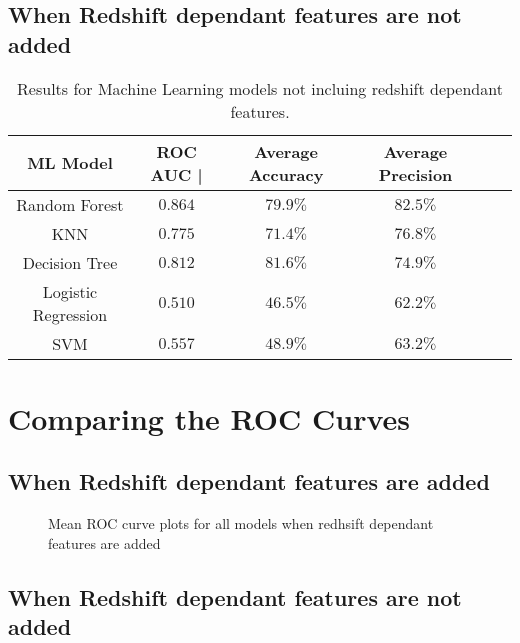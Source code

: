 \documentclass{report}
\begin{document}
\subsection{When Redshift dependant features are not added}
\begin{table}[h] 
  \centering
  \begin{tabular}{@{}cc@{}cc@{}cc@{}}
    \toprule
    ML Model & ROC AUC  | & Average Accuracy & Average Precision  \\
    \midrule
    Random Forest & $ 0.864$ & $79.9\%$ & $82.5\%$ \\
    KNN & $0.775$ & $71.4\%$ & $76.8\%$ \\
    Decision Tree & $0.812$ & $81.6\%$ & $74.9\%$ \\
    Logistic Regression & $0.510$ & $46.5\%$ & $62.2\%$ \\
    SVM & $0.557$ & $48.9\%$ & $63.2\%$ \\
    \bottomrule
  \end{tabular}
  \caption{Results for Machine Learning models not incluing redshift dependant features.}
  \label{results_2}
\end{table}

\newpage
\section{Comparing the ROC Curves}
\subsection{When Redshift dependant features are added}

\begin{figure}[H]%
    \centering
    \qquad
    \qquad
    \qquad
    \qquad
    \caption{Mean ROC curve plots for all models when redhsift dependant features are added}%
    \label{fig:1}%
\end{figure}
\subsection{When Redshift dependant features are not added}
\end{document}
